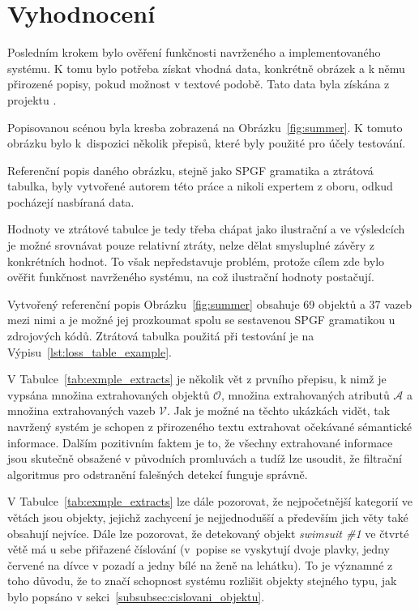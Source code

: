 \clearpage
\section{Vyhodnocení}\label{sec:vyhodnoceni}
Posledním krokem bylo ověření funkčnosti navrženého a implementovaného systému.
K tomu bylo potřeba získat vhodná data, konkrétně obrázek a k němu přirozené popisy, pokud možnost v textové podobě.
Tato data byla získána z projektu \projekt.

Popisovanou scénou byla kresba zobrazená na Obrázku~\ref{fig:summer}.
K tomuto obrázku bylo k~dispozici několik přepisů, které byly použité pro účely testování.

Referenční popis daného obrázku, stejně jako SPGF gramatika a ztrátová tabulka,
byly vytvořené autorem této práce a nikoli expertem z oboru, odkud pocházejí nasbíraná data.

Hodnoty ve ztrátové tabulce je tedy třeba chápat jako ilustrační a ve výsledcích je možné srovnávat pouze relativní ztráty,
nelze dělat smysluplné závěry z konkrétních hodnot.
To však nepředstavuje problém, protože cílem zde bylo ověřit funkčnost navrženého systému, na což ilustrační hodnoty postačují.

Vytvořený referenční popis Obrázku~\ref{fig:summer} obsahuje 69 objektů a 37 vazeb mezi nimi a je možné jej prozkoumat spolu se sestavenou SPGF gramatikou u zdrojových kódů.
Ztrátová tabulka použitá při testování je na Výpisu~\ref{lst:loss_table_example}.

% 
V Tabulce~\ref{tab:exmple_extracts} je několik vět z prvního přepisu, k nimž je vypsána množina extrahovaných objektů $\mathcal{O}$,
množina extrahovaných atributů $\mathcal A$ a množina extrahovaných vazeb $\mathcal V$.
Jak je možné na těchto ukázkách vidět, tak navržený systém je schopen z přirozeného textu extrahovat očekávané sémantické informace.
Dalším pozitivním faktem je to, že všechny extrahované informace jsou skutečně obsažené v původních promluvách a tudíž lze usoudit, že filtrační
algoritmus pro odstranění falešných detekcí funguje správně.



V Tabulce~\ref{tab:exmple_extracts} lze dále pozorovat, že nejpočetnější kategorií ve větách jsou objekty, jejichž zachycení je nejjednodušší a především jich věty také obsahují nejvíce.
Dále lze pozorovat, že detekovaný objekt \emph{swimsuit \#1} ve čtvrté větě má u sebe přiřazené číslování (v~popise se vyskytují dvoje plavky, jedny červené na dívce v pozadí
a jedny bílé na ženě na lehátku).
To je významné z toho důvodu, že to značí schopnost systému rozlišit objekty stejného typu, jak bylo popsáno v sekci~\ref{subsubsec:cislovani_objektu}.

